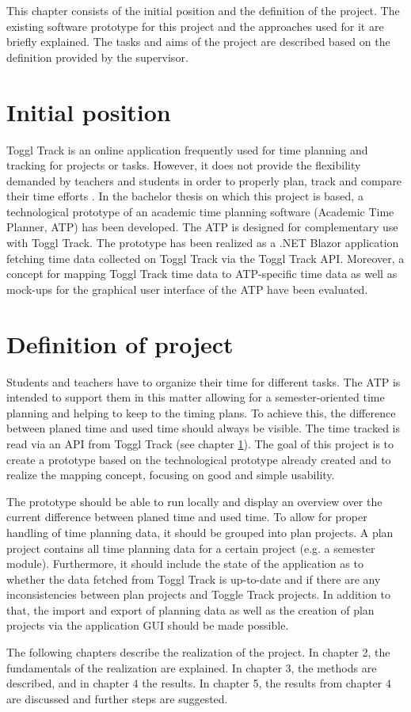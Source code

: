 
This chapter consists of the initial position and the definition of the project. The existing software prototype for this project and the approaches used for it are briefly explained. The tasks and aims of the project are described based on the definition provided by the supervisor.

\section{Initial position} \label{Initial position}
Toggl Track \cite{toggl_track_url} is an online application frequently used for time planning and tracking for projects or tasks. However, it does not provide the flexibility demanded by teachers and students in order to properly plan, track and compare their time efforts \cite{bachelorarbeit_Egger_Verstappen_page2}. In the bachelor thesis \cite{bachelorarbeit_Egger_Verstappen_page1} on which this project is based, a technological prototype of an academic time planning software (Academic Time Planner, ATP) has been developed. The ATP is designed for complementary use with Toggl Track. The prototype has been realized as a .NET Blazor application fetching time data collected on Toggl Track via the Toggl Track API. Moreover, a concept for mapping Toggl Track time data to ATP-specific time data as well as mock-ups for the graphical user interface of the ATP have been evaluated.

\section{Definition of project} \label{Definition}
Students and teachers have to organize their time for different tasks. The ATP is intended to support them in this matter allowing for a semester-oriented time planning and helping to keep to the timing plans. To achieve this, the difference between planed time and used time should always be visible. The time tracked is read via an API from Toggl Track (see chapter \ref{Initial position}). The goal of this project is to create a prototype based on the technological prototype already created and to realize the mapping concept, focusing on good and simple usability.

The prototype should be able to run locally and display an overview over the current difference between planed time and used time. To allow for proper handling of time planning data, it should be grouped into plan projects. A plan project contains all time planning data for a certain project (e.g. a semester module). Furthermore, it should include the state of the application as to whether the data fetched from Toggl Track is up-to-date and if there are any inconsistencies between plan projects and Toggle Track projects. In addition to that, the import and export of planning data as well as the creation of plan projects via the application GUI should be made possible.

The following chapters describe the realization of the project. In chapter 2, the fundamentals of the realization are explained. In chapter 3, the methods are described, and in chapter 4 the results. In chapter 5, the results from chapter 4 are discussed and further steps are suggested.
 


